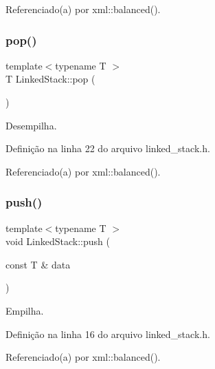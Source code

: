 Referenciado(a) por xml\+::balanced().

\mbox{\label{classstructures_1_1_linked_stack_af831820610fd8e0a145757813a9afb4b}} 
\subsubsection{\texorpdfstring{pop()}{pop()}}
{\footnotesize\ttfamily template$<$typename T $>$ \\
T Linked\+Stack\+::pop (\begin{DoxyParamCaption}{ }\end{DoxyParamCaption})}



Desempilha. 



Definição na linha 22 do arquivo linked\+\_\+stack.\+h.



Referenciado(a) por xml\+::balanced().

\mbox{\label{classstructures_1_1_linked_stack_a1af82de27376dbfb49c2872fef6cbcab}} 
\subsubsection{\texorpdfstring{push()}{push()}}
{\footnotesize\ttfamily template$<$typename T $>$ \\
void Linked\+Stack\+::push (\begin{DoxyParamCaption}\item[{const T \&}]{data }\end{DoxyParamCaption})}



Empilha. 



Definição na linha 16 do arquivo linked\+\_\+stack.\+h.



Referenciado(a) por xml\+::balanced().

\mbox{\label{classstructures_1_1_linked_stack_a0c7926b74ce17436c28fa18efd3f15a2}} 
